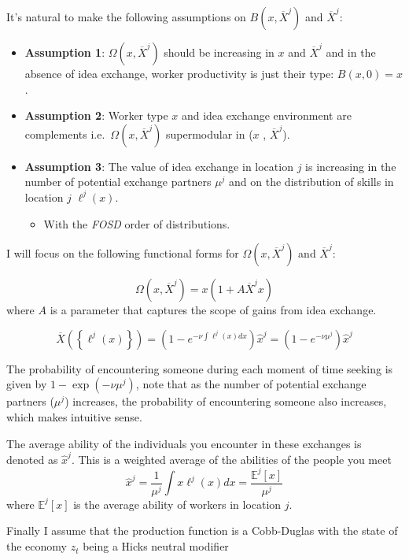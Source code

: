 \documentclass[
  letterpaper,
  DIV=11,
  numbers=noendperiod]{scrreprt}
\providecommand{\tightlist}{%
  \setlength{\itemsep}{0pt}\setlength{\parskip}{0pt}}\usepackage{longtable,booktabs,array}
\begin{document}
It's natural to make the following assumptions on
\(B(x, \overline{X}^j)\) and \(\overline{X}^j\):

\begin{itemize}
\tightlist
\item
  \textbf{Assumption 1}: \(\Omega(x, \overline{X}^j)\) should be
  increasing in \(x\) and \(\overline{X}^j\) and in the absence of idea
  exchange, worker productivity is just their type: \(B(x, 0) = x\).
\item
  \textbf{Assumption 2}: Worker type \(x\) and idea exchange environment
  are complements i.e.~\(\Omega(x, \overline{X}^j)\) supermodular in
  (\(x\) , \(\overline{X}^j\)).
\item
  \textbf{Assumption 3}: The value of idea exchange in location \(j\) is
  increasing in the number of potential exchange partners \(\mu^j\) and
  on the distribution of skills in location \(j\) \(\ell^j(x)\).

  \begin{itemize}
  \tightlist
  \item
    With the \emph{FOSD} order of distributions.
  \end{itemize}
\end{itemize}

I will focus on the following functional forms for
\(\Omega(x, \overline{X}^j)\) and \(\overline{X}^j\):

\[\Omega(x, \overline{X}^j) = x(1 + A \overline{X}^j x)\] where \(A\) is
a parameter that captures the scope of gains from idea exchange.

\[
    \overline{X}\left(\left\{\ell^j(x)\right\}\right) = \left(1 - e^{-\nu \int \ell^j(x) dx}\right)\hat{x}^j =\left(1 - e^{-\nu \mu^j} \right)\hat{x}^j
\]

The probability of encountering someone during each moment of time
seeking is given by \(1 - \exp(-ν \mu^j)\), note that as the number of
potential exchange partners (\(\mu^j\)) increases, the probability of
encountering someone also increases, which makes intuitive sense.

The average ability of the individuals you encounter in these exchanges
is denoted as \(\hat{x}^j\). This is a weighted average of the abilities
of the people you meet
\[\hat{x}^j = \frac{1}{\mu^j}\int{x\ell^j(x)dx}=\frac{\mathbb{E}^j[x]}{\mu^j}\]
where \(\mathbb{E}^j[x]\) is the average ability of workers in location
\(j\).

Finally I assume that the production function is a Cobb-Duglas with the
state of the economy \(z_t\) being a Hicks neutral modifier
\end{document}
